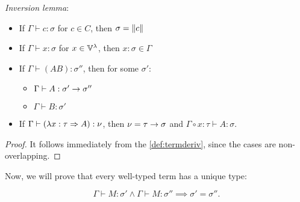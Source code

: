 \documentclass[main.tex]{subfiles}
\begin{document}
\begin{lemma}\label{lemma:inversion}
    \emph{Inversion lemma}:
    \begin{itemize}
        \item If $\Gamma \vdash c : \sigma$ for $c \in C$, then $\sigma = \|c\|$
        \item If $\Gamma \vdash x : \sigma$ for $x \in \mathbb{V}^{\lambda}$, then $x : \sigma \in \Gamma$
        \item If $\Gamma \vdash (AB) : \sigma''$, then for some $\sigma'$:
            \begin{itemize}
                \item $\Gamma \vdash A : \sigma' \rightarrow \sigma''$
                \item $\Gamma \vdash B : \sigma'$
            \end{itemize}
        \item If $\Gamma \vdash (\lambda x : \tau \Rightarrow A) : \nu$, then
            $\nu = \tau \rightarrow \sigma$ and $\Gamma \circ x : \tau \vdash A : \sigma$.
    \end{itemize}
\end{lemma}
\begin{proof}
    It follows immediately from the \cref{def:termderiv}, since the cases are
    non-overlapping.
\end{proof}
Now, we will prove that every well-typed term has a unique type:
\begin{prop}
    \label{prop:uniquetypespure}
    \[ \Gamma \vdash M : \sigma' \land \Gamma \vdash M : \sigma''
        \implies \sigma' = \sigma''. \]
\end{prop}
\end{document}
